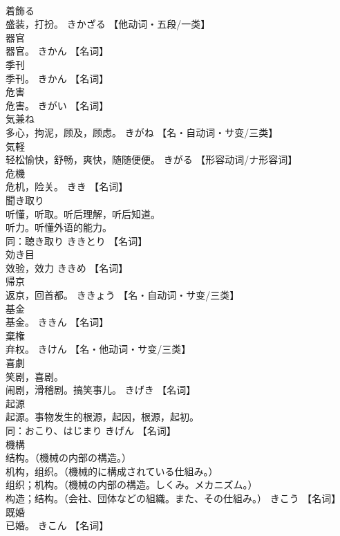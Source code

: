 \documentclass[8pt]{extreport}
\begin{document}
\begin{CJK}{UTF8}{min}
\\	着飾る	
\\	盛装，打扮。	きかざる		【他动词・五段/一类】
\\	器官	
\\	器官。	きかん		【名词】
\\	季刊	
\\	季刊。	きかん		【名词】
\\	危害	
\\	危害。	きがい		【名词】
\\	気兼ね	
\\	多心，拘泥，顾及，顾虑。	きがね		【名・自动词・サ变/三类】
\\	気軽	
\\	轻松愉快，舒畅，爽快，随随便便。	きがる		【形容动词/ナ形容词】
\\	危機	
\\	危机，险关。	きき		【名词】
\\	聞き取り	
\\	听懂，听取。听后理解，听后知道。 
\\	听力。听懂外语的能力。 
\\	同：聴き取り	ききとり		【名词】
\\	効き目	
\\	效验，效力	ききめ		【名词】
\\	帰京	
\\	返京，回首都。	ききょう		【名・自动词・サ变/三类】
\\	基金	
\\	基金。	ききん		【名词】
\\	棄権	
\\	弃权。	きけん		【名・他动词・サ变/三类】
\\	喜劇	
\\	笑剧，喜剧。 
\\	闹剧，滑稽剧。搞笑事儿。	きげき		【名词】
\\	起源	
\\	起源。事物发生的根源，起因，根源，起初。 
\\	同：おこり、はじまり	きげん		【名词】
\\	機構	
\\	结构。（機械の内部の構造。） 
\\	机构，组织。（機械的に構成されている仕組み。） 
\\	组织；机构。（機械の内部の構造。しくみ。メカニズム。） 
\\	构造；结构。（会社、団体などの組織。また、その仕組み。）	きこう		【名词】
\\	既婚	
\\	已婚。	きこん		【名词】

\end{CJK}
\end{document}
